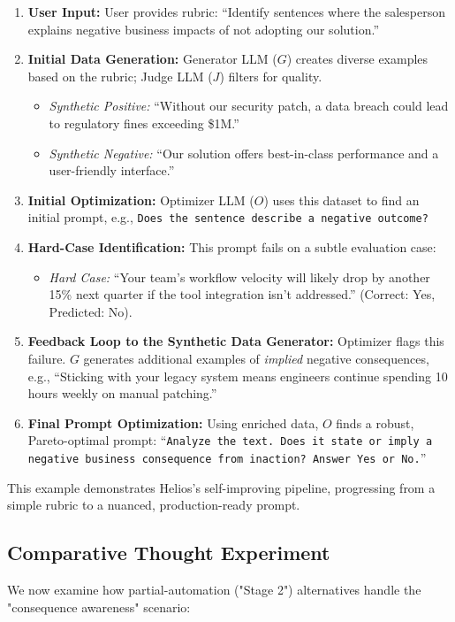 \documentclass{article}
\begin{document}
\begin{enumerate}
  \item \textbf{User Input:} User provides rubric: ``Identify sentences where the salesperson explains negative business impacts of not adopting our solution.''
  \item \textbf{Initial Data Generation:} Generator LLM ($G$) creates diverse examples based on the rubric; Judge LLM ($J$) filters for quality.
        \begin{itemize}
          \item \textit{Synthetic Positive:} ``Without our security patch, a data breach could lead to regulatory fines exceeding \$1M.''
          \item \textit{Synthetic Negative:} ``Our solution offers best-in-class performance and a user-friendly interface.''
        \end{itemize}
  \item \textbf{Initial Optimization:} Optimizer LLM ($O$) uses this dataset to find an initial prompt, e.g., \texttt{Does the sentence describe a negative outcome?}
  \item \textbf{Hard-Case Identification:} This prompt fails on a subtle evaluation case:
        \begin{itemize}
          \item \textit{Hard Case:} ``Your team's workflow velocity will likely drop by another 15\% next quarter if the tool integration isn't addressed.'' (Correct: Yes, Predicted: No).
        \end{itemize}
  \item \textbf{Feedback Loop to the Synthetic Data Generator:} Optimizer flags this failure. $G$ generates additional examples of \textit{implied} negative consequences, e.g., ``Sticking with your legacy system means engineers continue spending 10 hours weekly on manual patching.''
  \item \textbf{Final Prompt Optimization:} Using enriched data, $O$ finds a robust, Pareto-optimal prompt: ``\texttt{Analyze the text. Does it state or imply a negative business consequence from inaction? Answer Yes or No.}''
\end{enumerate}

This example demonstrates Helios's self-improving pipeline, progressing from a simple rubric to a nuanced, production-ready prompt.

\subsection{Comparative Thought Experiment}
\label{subsec:comparative_thought_experiment}
We now examine how partial-automation ("Stage 2") alternatives handle the "consequence awareness" scenario:
\end{document}
